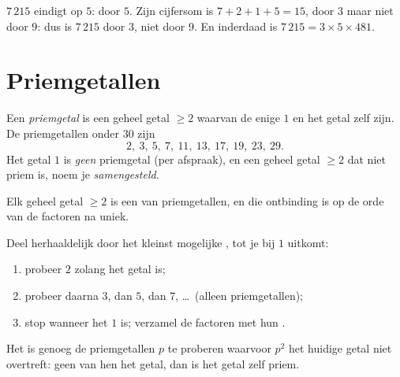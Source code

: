 \begin{example}
$7\,215$ eindigt op $5$:  door $5$. Zijn cijfersom is
$7 + 2 + 1 + 5 = 15$,  door $3$ maar niet door $9$: dus is $7\,215$
 door $3$, niet door $9$. En inderdaad is
$7\,215 = 3 \times 5 \times 481$.
\end{example}

\section{Priemgetallen}

\begin{definition}[Priemgetal]\label{def:g9:arith:prime}
Een \emph{priemgetal} is een geheel getal $\geq 2$ waarvan de
enige  $1$ en het getal zelf zijn. De priemgetallen onder $30$ zijn
\[
2,\ 3,\ 5,\ 7,\ 11,\ 13,\ 17,\ 19,\ 23,\ 29 .
\]
Het getal $1$ is \emph{geen} priemgetal (per afspraak), en een geheel getal
$\geq 2$ dat niet priem is, noem je \emph{samengesteld}.
\end{definition}

\begin{theorem}[Priemfactorontbinding]\label{thm:g9:arith:factorization}
Elk geheel getal $\geq 2$ is een  van priemgetallen, en die ontbinding is
op de orde van de factoren na uniek.
\end{theorem}
\admitted

\begin{method}\label{met:g9:arith:factorization}
Deel herhaaldelijk door het kleinst mogelijke , tot je bij $1$ uitkomt:
\begin{enumerate}
  \item probeer $2$ zolang het getal  is;
  \item probeer daarna $3$, dan $5$, dan $7$, \dots\ (alleen priemgetallen);
  \item stop wanneer het  $1$ is; verzamel de factoren met hun
        .
\end{enumerate}
Het is genoeg de priemgetallen $p$ te proberen waarvoor $p^2$ het huidige getal
niet overtreft:  geen van hen het getal, dan is het getal zelf priem.
\end{method}

